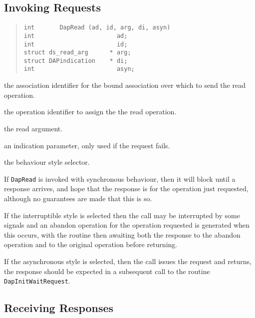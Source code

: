 \subsection {Invoking Requests}

\begin{quote}\small\begin{verbatim}
int       DapRead (ad, id, arg, di, asyn)
int                       ad;
int                       id;
struct ds_read_arg      * arg;
struct DAPindication    * di;
int                       asyn;
\end{verbatim}\end{quote}

\begin{describe}

\item [\verb"ad":]
the association identifier for the bound association over which to send
the read operation.

\item [\verb"id":]
the operation identifier to assign the the read operation.

\item [\verb"arg":]
the read argument.

\item [\verb"di":]
an indication parameter, only used if the request fails.

\item [\verb"asyn":]
the behaviour style selector.
\end{describe}

If \verb"DapRead" is invoked with synchronous behaviour, then it
will block until a response arrives, and hope that the response
is for the operation just requested, although no guarantees are
made that this is so.

If the interruptible style is selected then the call may be interrupted
by some signals and an abandon operation for the operation requested
is generated when this occurs, with the routine then awaiting both
the response to the abandon operation and to the original operation
before returning.

If the asynchronous style is selected, then the call issues the request
and returns, the response should be expected in a subsequent call to
the routine
\verb"DapInitWaitRequest".

\subsection {Receiving Responses}

